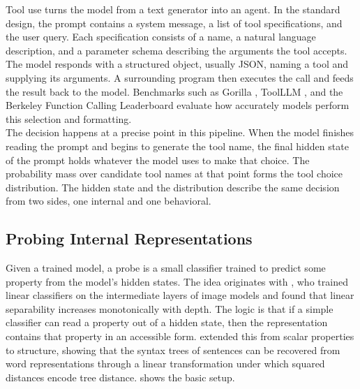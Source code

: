 Tool use turns the model from a text generator into an agent.
In the standard design, the prompt contains a system message, a list of tool specifications, and the user query.
Each specification consists of a name, a natural language description, and a parameter schema describing the arguments the tool accepts.
The model responds with a structured object, usually JSON, naming a tool and supplying its arguments.
A surrounding program then executes the call and feeds the result back to the model.
Benchmarks such as Gorilla \cite{patil2023gorilla}, ToolLLM \cite{qin2023toolllm}, and the Berkeley Function Calling Leaderboard \cite{yan2024bfcl} evaluate how accurately models perform this selection and formatting.
\\

The decision happens at a precise point in this pipeline.
When the model finishes reading the prompt and begins to generate the tool name, the final hidden state of the prompt holds whatever the model uses to make that choice.
The probability mass over candidate tool names at that point forms the tool choice distribution.
The hidden state and the distribution describe the same decision from two sides, one internal and one behavioral.

\subsection{Probing Internal Representations}
\label{sec:probing}

Given a trained model, a probe is a small classifier trained to predict some property from the model's hidden states.
The idea originates with \textcite{alain2016understanding}, who trained linear classifiers on the intermediate layers of image models and found that linear separability increases monotonically with depth.
The logic is that if a simple classifier can read a property out of a hidden state, then the representation contains that property in an accessible form.
\textcite{hewitt2019structural} extended this from scalar properties to structure, showing that the syntax trees of sentences can be recovered from word representations through a linear transformation under which squared distances encode tree distance.
 shows the basic setup.

